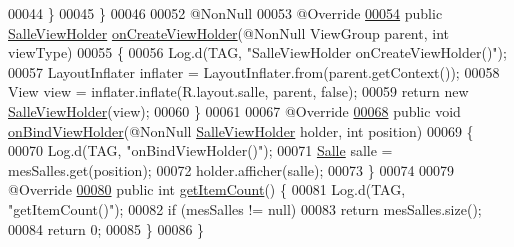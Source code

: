 \begin{DoxyCode}
00044         \}
00045     \}
00046 
00052     @NonNull
00053     @Override
\hyperlink{classcom_1_1lasalle_1_1meeting_1_1_salle_adapter_a35aef67b6f83b63fdc9898f6024b24ac}{00054}     \textcolor{keyword}{public} \hyperlink{classcom_1_1lasalle_1_1meeting_1_1_salle_view_holder}{SalleViewHolder} \hyperlink{classcom_1_1lasalle_1_1meeting_1_1_salle_adapter_a35aef67b6f83b63fdc9898f6024b24ac}{onCreateViewHolder}(@NonNull ViewGroup parent, \textcolor{keywordtype}{
      int} viewType)
00055     \{
00056         Log.d(TAG, \textcolor{stringliteral}{"SalleViewHolder onCreateViewHolder()"});
00057         LayoutInflater inflater = LayoutInflater.from(parent.getContext());
00058         View view = inflater.inflate(R.layout.salle, parent, \textcolor{keyword}{false});
00059         \textcolor{keywordflow}{return} \textcolor{keyword}{new} \hyperlink{classcom_1_1lasalle_1_1meeting_1_1_salle_view_holder}{SalleViewHolder}(view);
00060     \}
00061 
00067     @Override
\hyperlink{classcom_1_1lasalle_1_1meeting_1_1_salle_adapter_ac196b478a0ea01a05455bfe15111406f}{00068}     \textcolor{keyword}{public} \textcolor{keywordtype}{void} \hyperlink{classcom_1_1lasalle_1_1meeting_1_1_salle_adapter_ac196b478a0ea01a05455bfe15111406f}{onBindViewHolder}(@NonNull \hyperlink{classcom_1_1lasalle_1_1meeting_1_1_salle_view_holder}{SalleViewHolder} holder, \textcolor{keywordtype}{int} 
      position)
00069     \{
00070         Log.d(TAG, \textcolor{stringliteral}{"onBindViewHolder()"});
00071         \hyperlink{classcom_1_1lasalle_1_1meeting_1_1_salle}{Salle} salle = mesSalles.get(position);
00072         holder.afficher(salle);
00073     \}
00074 
00079     @Override
\hyperlink{classcom_1_1lasalle_1_1meeting_1_1_salle_adapter_a4ee9f3c4b020c3bfd88e072bb21bc5fc}{00080}     \textcolor{keyword}{public} \textcolor{keywordtype}{int} \hyperlink{classcom_1_1lasalle_1_1meeting_1_1_salle_adapter_a4ee9f3c4b020c3bfd88e072bb21bc5fc}{getItemCount}() \{
00081         Log.d(TAG, \textcolor{stringliteral}{"getItemCount()"});
00082         \textcolor{keywordflow}{if} (mesSalles != null)
00083             \textcolor{keywordflow}{return} mesSalles.size();
00084         \textcolor{keywordflow}{return} 0;
00085     \}
00086 \}
\end{DoxyCode}

